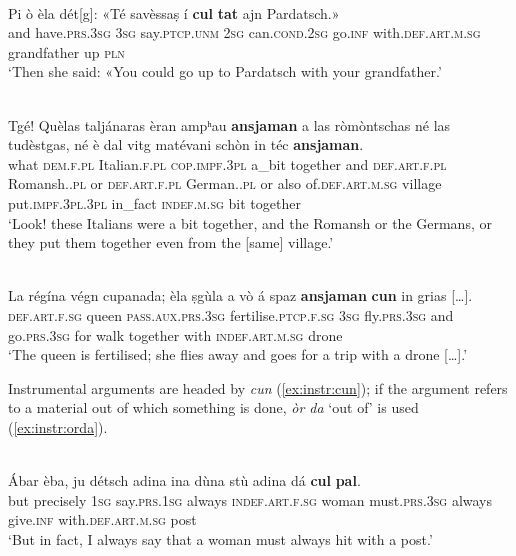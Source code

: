 \ea
\label{ex:comcun}
\\
\gll  Pi ò èla dét[g]: «Té savèssaṣ í \textbf{cul} \textbf{tat} ajn Pardatsch.»  \\
and have.\textsc{prs.3sg} \textsc{3sg} say.\textsc{ptcp.unm} \textsc{2sg} can.\textsc{cond.2sg} go.\textsc{inf} with.\textsc{def.art.m.sg} grandfather up \textsc{pln}  \\
\glt `Then she said: «You could go up to Pardatsch with your grandfather.'
\z

\ea
\label{ex:ansjaman}
\\
\gll    Tgé! Quèlas taljánaras èran ampʰau \textbf{ansjaman} a las ròmòntschas né las tudèstgas, né è dal vitg matévani schòn in téc \textbf{ansjaman}.\\
what \textsc{dem.f.pl} Italian.\textsc{f.pl} \textsc{cop.impf.3pl} a\_bit together and \textsc{def\textbf{}.art.f.pl} Romansh.\textsc{.pl} or  \textsc{def.art.f.pl} German.\textsc{.pl} or also of.\textsc{def.art.m.sg} village put.\textsc{impf.3pl.3pl} in\_fact \textsc{indef.m.sg} bit together\\
\glt `Look! these Italians were a bit together, and the Romansh or the Germans, or they put them together even from the [same] village.'
\z

\ea
\label{ex:ansjamancun}
\\
\gll   La régína végn cupanada; èla ṣgùla a vò á spaz \textbf{ansjaman} \textbf{cun} in grias […]. \\
    \textsc{def.art.f.sg} queen  \textsc{pass.aux.prs.3sg} fertilise.\textsc{ptcp.f.sg} \textsc{3sg} fly.\textsc{prs.3sg} and go.\textsc{prs.3sg} for walk together with \textsc{indef.art.m.sg} drone \\
\glt `The queen is fertilised; she flies away and goes for a trip with a drone […].'
\z

Instrumental arguments are headed by \textit{cun} (\ref{ex:instr:cun}); if the argument refers to a material out of which something is done, \textit{òr da} `out of' is used (\ref{ex:instr:orda}).

\ea
\label{ex:instr:cun}
\\
\gll Ábar èba, ju détsch adina ina dùna stù adina dá \textbf{cul} \textbf{pal}.\\
but precisely \textsc{1sg} say.\textsc{prs.1sg} always \textsc{indef.art.f.sg} woman must.\textsc{prs.3sg} always give.\textsc{inf} with.\textsc{def.art.m.sg} post\\
\glt `But in fact, I always say that a woman must always hit with a post.'
\z

